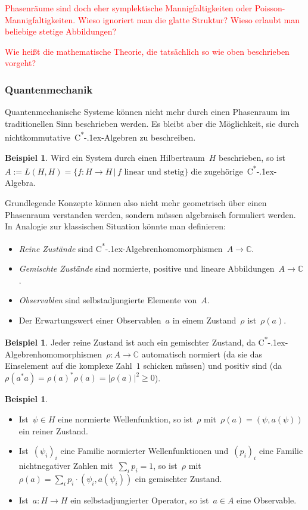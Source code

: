 \documentclass[a4paper,ngerman,12pt]{scrartcl}
\theoremstyle{definition}
\newtheorem{bsp}[defn]{Beispiel}
\theoremstyle{plain}
\theoremstyle{remark}
\newcommand{\CC}{\mathbb{C}}
\newcommand{\csalgebra}{C\textsuperscript{*}\kern-.1ex-Algebra}
\newcommand{\csalgebren}{C\textsuperscript{*}\kern-.1ex-Alge\-bren}
\renewcommand{\_}{\mathpunct{.}\,}
\newcommand{\?}{\,{:}\,}
\newcommand{\XXX}[1]{\textcolor{red}{#1}}
\begin{document}
\XXX{Phasenräume sind doch eher symplektische Mannigfaltigkeiten oder
Pois\-son-Man\-nig\-fal\-tig\-kei\-ten. Wieso ignoriert man die glatte
Struktur? Wieso erlaubt man beliebige stetige Abbildungen?}

\XXX{Wie heißt die mathematische Theorie, die tatsächlich so wie oben
beschrieben vorgeht?}


\subsubsection*{Quantenmechanik}

Quantenmechanische Systeme können nicht mehr durch einen Phasenraum im
traditionellen Sinn beschrieben werden. Es bleibt aber die Möglichkeit, sie
durch nichtkommutative~\csalgebren{} zu beschreiben.

\begin{bsp}Wird ein System durch einen Hilbertraum~$H$ beschrieben, so ist~$A
:= L(H,H) = \{ f : H \to H \,|\, \text{$f$ linear und stetig} \}$ die
zugehörige~\csalgebra.\end{bsp}

Grundlegende Konzepte können also nicht mehr geometrisch über einen Phasenraum
verstanden werden, sondern müssen algebraisch formuliert werden. In Analogie
zur klassischen Situation könnte man definieren:
\begin{itemize}
\item \emph{Reine Zustände} sind \csalgebren{}\-homo\-mor\-phis\-men~$A \to
\CC$.
\item \emph{Gemischte Zustände} sind normierte, positive und lineare
Abbildungen~$A \to \CC$.
\item \emph{Observablen} sind selbstadjungierte Elemente von~$A$.
\item Der Erwartungswert einer Observablen~$a$ in einem Zustand~$\rho$
ist~$\rho(a)$.
\end{itemize}

\begin{bsp}Jeder reine Zustand ist auch ein gemischter Zustand, da
\csalgebren{}\-homo\-mor\-phis\-men~$\rho : A \to \CC$ automatisch normiert (da sie das
Einselement auf die komplexe Zahl~$1$ schicken müssen) und positiv sind
(da~$\rho(a^* a) = \rho(a)^* \rho(a) = |\rho(a)|^2 \geq 0$).\end{bsp}

\begin{bsp}\begin{itemize}
\item Ist~$\psi \in H$ eine normierte Wellenfunktion, so ist~$\rho$
mit~$\rho(a) = (\psi, a(\psi))$ ein reiner Zustand.
\item Ist~$(\psi_i)_i$ eine Familie normierter Wellenfunktionen und~$(p_i)_i$
eine Familie nichtnegativer Zahlen mit~$\sum_i p_i = 1$, so ist~$\rho$
mit~$\rho(a) = \sum_i p_i \cdot (\psi_i, a(\psi_i))$ ein gemischter Zustand.
\item Ist~$a : H \to H$ ein selbstadjungierter Operator, so ist~$a \in A$ eine
Observable.
\end{itemize}
\end{bsp}
\end{document}

